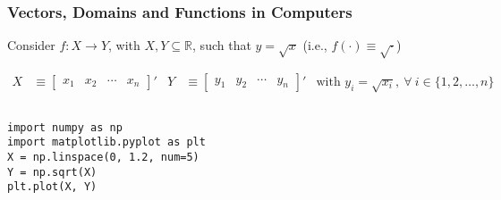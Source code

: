 \documentclass[10pt, aspectratio=1610, handout]{beamer}
\newcommand{\backbutton}[1]{\hyperlink{#1}{\beamerreturnbutton{Back}}}
\begin{document}
  \begin{frame}
    \frametitle{Vectors, Domains and Functions in Computers} \label{apx:grid_example}

    Consider $f : X \to Y$, with $X, Y \subseteq \mathbb{R}$, such that $y = \sqrt{x}$ (i.e., $f(\cdot) \equiv \sqrt{\cdot}$)

    \vfill

    \begin{align*}
      X &\equiv
      \begin{bmatrix}
        x_1 & x_2 & \cdots & x_n
      \end{bmatrix}'
      &
      Y &\equiv
      \begin{bmatrix}
        y_1 & y_2 & \cdots & y_n
      \end{bmatrix}'
      &
      \text{with } y_i = \sqrt{x_i},\ \forall\ i \in \{1, 2, \ldots, n\}
    \end{align*}

    \vfill

    \begin{columns}
      \begin{column}{0.475\textwidth}
        \texttt{import numpy as np} \\
        \texttt{import matplotlib.pyplot as plt} \\
        \texttt{X = np.linspace(0, 1.2, num=5)} \\
        \texttt{Y = np.sqrt(X)} \\
        \texttt{plt.plot(X, Y)}
      \end{column}
      \begin{column}{0.375\textwidth}
        \begin{figure}
          \centering
        \end{figure}
      \end{column}
    \end{columns}

    \vfill

    \hfill \backbutton{sld:grid}

  \end{frame}
\end{document}
